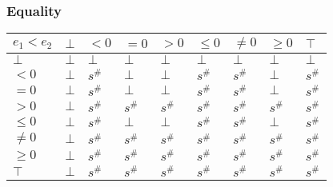 \documentclass{beamer}
\begin{document}
        \begin{frame}
            \frametitle{Equality}
        \begin{table}
            \begin{tabular}{|l|l|l|l|l|l|l|l|l|}
            \hline
            $e_1 < e_2$ & $\bot$ & $<0$   & $=0$   & $>0$   & $\le 0$ & $\ne 0$ & $\ge 0$ & $\top$ \\ \hline
            $\bot$      & $\bot$ & $\bot$ & $\bot$ & $\bot$ & $\bot$  & $\bot$  & $\bot$  & $\bot$ \\ \hline
            $<0$        & $\bot$ & $s^\#$ & $\bot$ & $\bot$ & $s^\#$  & $s^\#$  & $\bot$  & $s^\#$ \\ \hline
            $=0$        & $\bot$ & $s^\#$ & $\bot$ & $\bot$ & $s^\#$  & $s^\#$  & $\bot$  & $s^\#$ \\ \hline
            $>0$        & $\bot$ & $s^\#$ & $s^\#$ & $s^\#$ & $s^\#$  & $s^\#$  & $s^\#$  & $s^\#$ \\ \hline
            $\le 0$     & $\bot$ & $s^\#$ & $\bot$ & $\bot$ & $s^\#$  & $s^\#$  & $\bot$  & $s^\#$ \\ \hline
            $\ne 0$     & $\bot$ & $s^\#$ & $s^\#$ & $s^\#$ & $s^\#$  & $s^\#$  & $s^\#$  & $s^\#$ \\ \hline
            $\ge 0$     & $\bot$ & $s^\#$ & $s^\#$ & $s^\#$ & $s^\#$  & $s^\#$  & $s^\#$  & $s^\#$ \\ \hline
            $\top$      & $\bot$ & $s^\#$ & $s^\#$ & $s^\#$ & $s^\#$  & $s^\#$  & $s^\#$  & $s^\#$ \\ \hline
            \end{tabular}
            \end{table}
        \end{frame}
\end{document}
